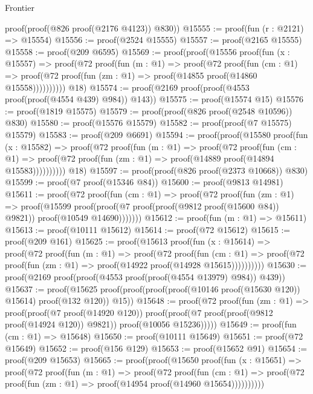 \begin{lexlean}{Frontier}
\begin{coremodule}
      proof(proof(@826 proof(@2176 @4123)) @830))
@15555 := proof(fun (r : @2121) => @15554)
@15556 := proof(@2524 @15555)
@15557 := proof(@2165 @15555)
@15558 := proof(@209 @6595)
@15569 := proof(proof(@15556
        proof(fun (x : @15557) =>
          proof(@72
              proof(fun (m : @1) =>
                proof(@72
                    proof(fun (cm : @1) =>
                      proof(@72 proof(fun (zm : @1) => proof(@14855 proof(@14860 @15558))))))))))
      @18)
@15574 := proof(@2169 proof(proof(@4553 proof(proof(@4554 @439) @984)) @143))
@15575 := proof(@15574 @15)
@15576 := proof(@1819 @15575)
@15579 := proof(proof(@826 proof(@2548 @10596)) @830)
@15580 := proof(@15576 @15579)
@15582 := proof(proof(@7 @15575) @15579)
@15583 := proof(@209 @6691)
@15594 := proof(proof(@15580
        proof(fun (x : @15582) =>
          proof(@72
              proof(fun (m : @1) =>
                proof(@72
                    proof(fun (cm : @1) =>
                      proof(@72 proof(fun (zm : @1) => proof(@14889 proof(@14894 @15583))))))))))
      @18)
@15597 := proof(proof(@826 proof(@2373 @10668)) @830)
@15599 := proof(@7 proof(@15346 @84))
@15600 := proof(@9813 @14981)
@15611 := proof(@72
      proof(fun (cm : @1) =>
        proof(@72
            proof(fun (zm : @1) =>
              proof(@15599
                  proof(proof(@7 proof(proof(@9812 proof(@15600 @84)) @9821))
                      proof(@10549 @14690)))))))
@15612 := proof(fun (m : @1) => @15611)
@15613 := proof(@10111 @15612)
@15614 := proof(@72 @15612)
@15615 := proof(@209 @161)
@15625 := proof(@15613
      proof(fun (x : @15614) =>
        proof(@72
            proof(fun (m : @1) =>
              proof(@72
                  proof(fun (cm : @1) =>
                    proof(@72 proof(fun (zm : @1) => proof(@14922 proof(@14928 @15615))))))))))
@15630 := proof(@2169 proof(proof(@4553 proof(proof(@4554 @13979) @984)) @439))
@15637 := proof(@15625
      proof(proof(proof(proof(@10146 proof(@15630 @120)) @15614) proof(@132 @120)) @15))
@15648 := proof(@72
      proof(fun (zm : @1) =>
        proof(proof(@7 proof(@14920 @120))
            proof(proof(@7 proof(proof(@9812 proof(@14924 @120)) @9821)) proof(@10056 @15236)))))
@15649 := proof(fun (cm : @1) => @15648)
@15650 := proof(@10111 @15649)
@15651 := proof(@72 @15649)
@15652 := proof(@156 @129)
@15653 := proof(@15652 @91)
@15654 := proof(@209 @15653)
@15665 := proof(proof(@15650
        proof(fun (x : @15651) =>
          proof(@72
              proof(fun (m : @1) =>
                proof(@72
                    proof(fun (cm : @1) =>
                      proof(@72 proof(fun (zm : @1) => proof(@14954 proof(@14960 @15654))))))))))

\end{coremodule}
\end{lexlean}
